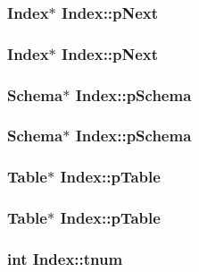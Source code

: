 \subsubsection{\setlength{\rightskip}{0pt plus 5cm}\bf{Index}$\ast$ \bf{Index::p\-Next}}\label{structIndex_40527868c308bcf0b9c2297ad659350a}


\subsubsection{\setlength{\rightskip}{0pt plus 5cm}\bf{Index}$\ast$ \bf{Index::p\-Next}}\label{structIndex_40527868c308bcf0b9c2297ad659350a}


\subsubsection{\setlength{\rightskip}{0pt plus 5cm}\bf{Schema}$\ast$ \bf{Index::p\-Schema}}\label{structIndex_7981c2adcf36e5244f966cce071dab56}


\subsubsection{\setlength{\rightskip}{0pt plus 5cm}\bf{Schema}$\ast$ \bf{Index::p\-Schema}}\label{structIndex_7981c2adcf36e5244f966cce071dab56}


\subsubsection{\setlength{\rightskip}{0pt plus 5cm}\bf{Table}$\ast$ \bf{Index::p\-Table}}\label{structIndex_872c6dfc95f150aeeab05c68b25558a5}


\subsubsection{\setlength{\rightskip}{0pt plus 5cm}\bf{Table}$\ast$ \bf{Index::p\-Table}}\label{structIndex_872c6dfc95f150aeeab05c68b25558a5}


\subsubsection{\setlength{\rightskip}{0pt plus 5cm}int \bf{Index::tnum}}\label{structIndex_0c0776cd26573266354ba5306e6f3ef4}


